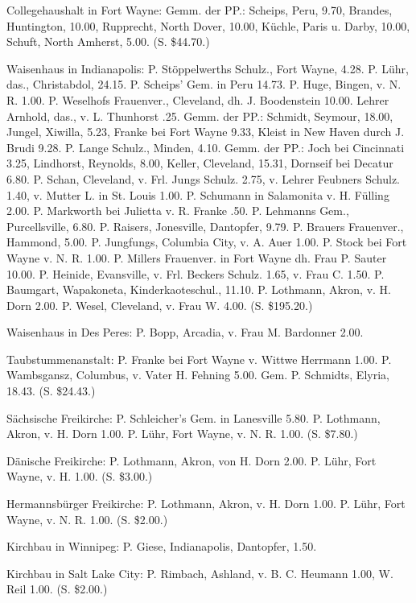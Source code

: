 Collegehaushalt in Fort Wayne: Gemm. der PP.: Scheips, Peru, 9.70, Brandes, Huntington, 10.00, Rupprecht, North Dover, 10.00, Küchle, Paris u. Darby, 10.00, Schuft, North Amherst, 5.00. (S. \$44.70.)

Waisenhaus in Indianapolis: P. Stöppelwerths Schulz., Fort Wayne, 4.28. P. Lühr, das., Christabdol, 24.15. P. Scheips’ Gem. in Peru 14.73. P. Huge, Bingen, v. N. R. 1.00. P. Weselhofs Frauenver., Cleveland, dh. J. Boodenstein 10.00. Lehrer Arnhold, das., v. L. Thunhorst .25. Gemm. der PP.: Schmidt, Seymour, 18.00, Jungel, Xiwilla, 5.23, Franke bei Fort Wayne 9.33, Kleist in New Haven durch J. Brudi 9.28. P. Lange Schulz., Minden, 4.10. Gemm. der PP.: Joch bei Cincinnati 3.25, Lindhorst, Reynolds, 8.00, Keller, Cleveland, 15.31, Dornseif bei Decatur 6.80. P. Schan, Cleveland, v. Frl. Jungs Schulz. 2.75, v. Lehrer Feubners Schulz. 1.40, v. Mutter L. in St. Louis 1.00. P. Schumann in Salamonita v. H. Fülling 2.00. P. Markworth bei Julietta v. R. Franke .50. P. Lehmanns Gem., Purcellsville, 6.80. P. Raisers, Jonesville, Dantopfer, 9.79. P. Brauers Frauenver., Hammond, 5.00. P. Jungfungs, Columbia City, v. A. Auer 1.00. P. Stock bei Fort Wayne v. N. R. 1.00. P. Millers Frauenver. in Fort Wayne dh. Frau P. Sauter 10.00. P. Heinide, Evansville, v. Frl. Beckers Schulz. 1.65, v. Frau C. 1.50. P. Baumgart, Wapakoneta, Kinderkaoteschul., 11.10. P. Lothmann, Akron, v. H. Dorn 2.00. P. Wesel, Cleveland, v. Frau W. 4.00. (S. \$195.20.)

Waisenhaus in Des Peres: P. Bopp, Arcadia, v. Frau M. Bardonner 2.00.

Taubstummenanstalt: P. Franke bei Fort Wayne v. Wittwe Herrmann 1.00. P. Wambsgansz, Columbus, v. Vater H. Fehning 5.00. Gem. P. Schmidts, Elyria, 18.43. (S. \$24.43.)

Sächsische Freikirche: P. Schleicher’s Gem. in Lanesville 5.80. P. Lothmann, Akron, v. H. Dorn 1.00. P. Lühr, Fort Wayne, v. N. R. 1.00. (S. \$7.80.)

Dänische Freikirche: P. Lothmann, Akron, von H. Dorn 2.00. P. Lühr, Fort Wayne, v. H. 1.00. (S. \$3.00.)

Hermannsbürger Freikirche: P. Lothmann, Akron, v. H. Dorn 1.00. P. Lühr, Fort Wayne, v. N. R. 1.00. (S. \$2.00.)

Kirchbau in Winnipeg: P. Giese, Indianapolis, Dantopfer, 1.50.

Kirchbau in Salt Lake City: P. Rimbach, Ashland, v. B. C. Heumann 1.00, W. Reil 1.00. (S. \$2.00.)


